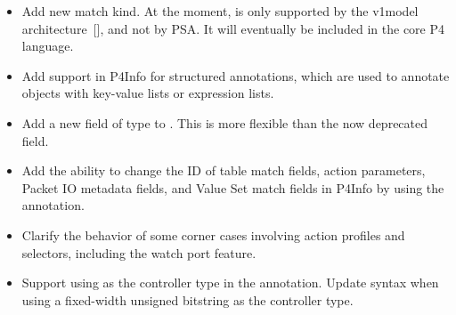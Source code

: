 \documentclass[11pt]{article}
\begin{document}
{%
\begin{itemize}[noitemsep,topsep=\mdcompacttopsep]%

\item{}Add new  match kind. At the moment,  is only supported by
the v1model architecture~[], and not by PSA. It will eventually be
included in the core P4 language.%

\item{}Add support in P4Info for structured annotations, which are used to annotate
objects with key-value lists or expression lists.%

\item{}Add a new  field of type  to . This is more
flexible than the now deprecated  field.%

\item{}Add the ability to change the ID of table match fields, action parameters,
Packet IO metadata fields, and Value Set match fields in P4Info by using the
 annotation.%

\item{}Clarify the behavior of some corner cases involving action profiles and
selectors, including the watch port feature.%

\item{}Support using  as the controller type in the 
annotation. Update syntax when using a fixed-width unsigned bitstring as the
controller type.%


\end{itemize}}
\end{document}
